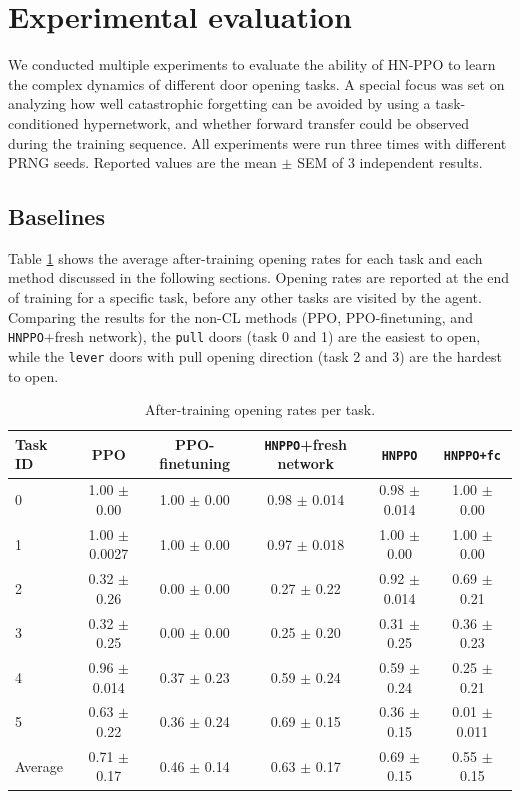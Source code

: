 \documentclass[dvipsnames]{article} %
\begin{document}
\section{Experimental evaluation}
\label{chap:experiments}
We conducted multiple experiments to evaluate the ability of HN-PPO to learn the complex dynamics of different door opening tasks. A special focus was set on analyzing how well catastrophic forgetting can be avoided by using a task-conditioned hypernetwork, and whether forward transfer could be observed during the training sequence. All experiments were run three times with different PRNG seeds. Reported values are the mean $\pm$ SEM of 3 independent results.

\subsection{Baselines}

Table \ref{tab:opening-rates} shows the average after-training opening rates for each task and each method discussed in the following sections. Opening rates are reported at the end of training for a specific task, before any other tasks are visited by the agent. Comparing the results for the non-CL methods (PPO, PPO-finetuning, and \texttt{HNPPO}+fresh network), the \texttt{pull} doors (task 0 and 1) are the easiest to open, while the \texttt{lever} doors with pull opening direction (task 2 and 3) are the hardest to open.

\begin{table}[tb]
\caption{After-training opening rates per task.}
\label{tab:opening-rates}
\begin{center}
\begin{tabular}{@{}lccccc@{}}
\toprule
Task ID & PPO & PPO-finetuning & \texttt{HNPPO}+fresh network & \texttt{HNPPO} & \texttt{HNPPO+fc} \\ 
\midrule
0 & 1.00 $\pm$ 0.00  & 1.00 $\pm$ 0.00& 0.98 $\pm$ 0.014 & 0.98 $\pm$ 0.014 & 1.00 $\pm$ 0.00\\
1 & 1.00 $\pm$ 0.0027& 1.00 $\pm$ 0.00& 0.97 $\pm$ 0.018 & 1.00 $\pm$ 0.00  & 1.00 $\pm$ 0.00 \\
2 & 0.32 $\pm$ 0.26  & 0.00 $\pm$ 0.00& 0.27 $\pm$ 0.22  & 0.92 $\pm$ 0.014 & 0.69 $\pm$ 0.21\\
3 & 0.32 $\pm$ 0.25  & 0.00 $\pm$ 0.00& 0.25 $\pm$ 0.20  & 0.31 $\pm$ 0.25  & 0.36 $\pm$ 0.23\\
4 & 0.96 $\pm$ 0.014 & 0.37 $\pm$ 0.23& 0.59 $\pm$ 0.24  & 0.59 $\pm$ 0.24  & 0.25 $\pm$ 0.21\\
5 & 0.63 $\pm$ 0.22  & 0.36 $\pm$ 0.24& 0.69 $\pm$ 0.15  & 0.36 $\pm$ 0.15  & 0.01 $\pm$ 0.011\\
\midrule
Average & 0.71 $\pm$ 0.17 & 0.46 $\pm$ 0.14 & 0.63 $\pm$ 0.17 & 0.69 $\pm$ 0.15 & 0.55 $\pm$ 0.15\\
\bottomrule
\end{tabular}
\end{center}
\end{table}
\end{document}
